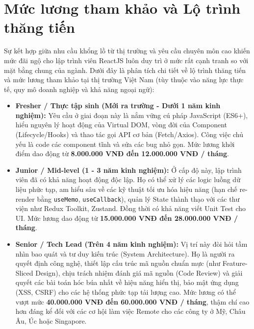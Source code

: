 \section{Mức lương tham khảo và Lộ trình thăng tiến}
Sự kết hợp giữa nhu cầu khổng lồ từ thị trường và yêu cầu chuyên môn cao khiến mức đãi ngộ cho lập trình viên ReactJS luôn duy trì ở mức rất cạnh tranh so với mặt bằng chung của ngành. Dưới đây là phân tích chi tiết về lộ trình thăng tiến và mức lương tham khảo tại thị trường Việt Nam (tùy thuộc vào năng lực thực tế, quy mô doanh nghiệp và khả năng ngoại ngữ):

\begin{itemize}
    \item \textbf{Fresher / Thực tập sinh (Mới ra trường - Dưới 1 năm kinh nghiệm):}
    Yêu cầu ở giai đoạn này là nắm vững cú pháp JavaScript (ES6+), hiểu nguyên lý hoạt động của Virtual DOM, vòng đời của Component (Lifecycle/Hooks) và thao tác gọi API cơ bản (Fetch/Axios). Công việc chủ yếu là code các component tĩnh và sửa các bug nhỏ gọn.
    Mức lương khởi điểm dao động từ \textbf{8.000.000 VNĐ đến 12.000.000 VNĐ / tháng}.

    \item \textbf{Junior / Mid-level (1 - 3 năm kinh nghiệm):}
    Ở cấp độ này, lập trình viên đã có khả năng hoạt động độc lập. Họ có thể xử lý các logic luồng dữ liệu phức tạp, am hiểu sâu về các kỹ thuật tối ưu hóa hiệu năng (hạn chế re-render bằng \texttt{useMemo}, \texttt{useCallback}), quản lý State thành thạo với các thư viện như Redux Toolkit, Zustand. Đồng thời có khả năng viết Unit Test cho UI.
    Mức lương dao động từ \textbf{15.000.000 VNĐ đến 28.000.000 VNĐ / tháng}.

    \item \textbf{Senior / Tech Lead (Trên 4 năm kinh nghiệm):}
    Vị trí này đòi hỏi tầm nhìn bao quát và tư duy kiến trúc (System Architecture). Họ là người ra quyết định công nghệ, thiết lập cấu trúc mã nguồn chuẩn mực (như Feature-Sliced Design), chịu trách nhiệm đánh giá mã nguồn (Code Review) và giải quyết các bài toán hóc búa nhất về hiệu năng hiển thị, bảo mật ứng dụng (XSS, CSRF) cho các hệ thống phức tạp tải lượng cao.
    Mức lương có thể vượt mức \textbf{40.000.000 VNĐ đến 60.000.000 VNĐ / tháng}, thậm chí cao hơn đáng kể đối với các cơ hội làm việc Remote cho các công ty ở Mỹ, Châu Âu, Úc hoặc Singapore.
\end{itemize}

